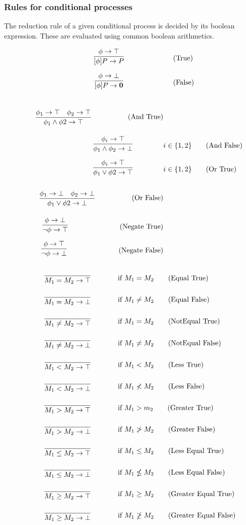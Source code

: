 \FloatBarrier

\subsubsection{Rules for conditional processes}
The reduction rule of a given conditional process is decided by its boolean expression. These are evaluated using common boolean arithmetics.

\begin{align}
	& \infrule{\phi \ra \top}{[\phi]P\ra P} \tag{True}\\
	& \infrule{\phi \ra \bot}{[\phi]P\ra \nil} \tag{False}
\end{align}

\begin{align*}
\infrule{\phi_1 \ra \top \quad \phi_2 \ra \top}{\phi_1 \wedge \phi2 \ra \top}\tag{And True}\\
\infrule{\phi_i \ra \top}{\phi_1 \wedge \phi_2 \ra \bot} &i\in \{1,2\}\tag{And False}\\
\infrule{\phi_i \ra \top}{\phi_1 \vee \phi2 \ra \top} &i\in \{1,2\} \tag{Or True}\\
\infrule{\phi_1 \ra \bot \quad \phi_2 \ra \bot}{\phi_1 \vee \phi2 \ra \bot} \tag{Or False}\\
\infrule{\phi \ra \bot}{\neg\phi \ra \top} \tag{Negate True}\\
\infrule{\phi \ra \top}{\neg\phi \ra \bot} \tag{Negate False}\\
\end{align*}

\begin{align*}
\infrule{}{M_1 = M_2 \ra \top}& \text{if }M_1=M_2 \tag{Equal True}\\
\infrule{}{M_1 = M_2 \ra \bot}& \text{if }M_1\neq M_2 \tag{Equal False}\\
\infrule{}{M_1 \neq M_2 \ra \top}& \text{if }M_1=M_2 \tag{NotEqual True}\\
\infrule{}{M_1 \neq M_2 \ra \bot}& \text{if }M_1\neq M_2 \tag{NotEqual False}\\
\infrule{}{M_1 < M_2 \ra \top}& \text{if }M_1<M_2 \tag{Less True}\\
\infrule{}{M_1 < M_2 \ra \bot}& \text{if }M_1\nless M_2 \tag{Less False}\\
\infrule{}{M_1 > M_2 \ra \top}& \text{if }M_1>m_2 \tag{Greater True}\\
\infrule{}{M_1 > M_2 \ra \bot}& \text{if }M_1\ngtr M_2 \tag{Greater False}\\
\infrule{}{M_1 \leq M_2 \ra \top}& \text{if }M_1\leq M_2 \tag{Less Equal True}\\
\infrule{}{M_1 \leq M_2 \ra \bot}& \text{if }M_1\nleq M_2 \tag{Less Equal False}\\
\infrule{}{M_1 \geq M_2 \ra \top}& \text{if }M_1\geq M_2 \tag{Greater Equal True}\\
\infrule{}{M_1 \geq M_2 \ra \bot}& \text{if }M_1\ngeq M_2 \tag{Greater Equal False}
\end{align*}
	

\FloatBarrier



